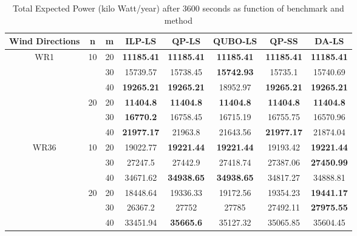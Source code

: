 \documentclass[preprint,12pt]{elsarticle}
\begin{document}
\begin{table}[ht]

	\begin{tabular}{| c | c | c | c | c | c | c | c |}
		\toprule
		Wind Directions  & n        & m        & ILP-LS       & QP-LS       & QUBO-LS       & QP-SS       & DA-LS     \\
		\toprule
		\multirow{6}{*}{WR1}  & \multirow{3}{*}{10}       & 20       & \textbf{11185.41} & \textbf{11185.41} & \textbf{11185.41} & \textbf{11185.41} & \textbf{11185.41} \\
			& & 30   & 15739.57 & 15738.45 & \textbf{15742.93} & 15735.1  & 15740.69         \\
		& & 40 & \textbf{19265.21} & \textbf{19265.21} & 18952.97 & \textbf{19265.21} & \textbf{19265.21}                \\
				\cline{2-8}
		&\multirow{3}{*}{20}   & 20       & \textbf{11404.8}  & \textbf{11404.8}  & \textbf{11404.8}  & \textbf{11404.8}  & \textbf{11404.8}           \\
		&&30   & \textbf{16770.2} & 16758.45 & 16715.19 & 16755.75 & 16570.96                   \\
		&&40   & \textbf{21977.17} & 21963.8 & 21643.56 & \textbf{21977.17} & 21874.04                     \\
		\hline
		\multirow{6}{*}{WR36} &  \multirow{3}{*}{10}    & 20       & 19022.77 & \textbf{19221.44} & \textbf{19221.44} & 19193.42 & \textbf{19221.44} \\
		&& 30   & 27247.5  & 27442.9  & 27418.74 & 27387.06 & \textbf{27450.99}                  \\
		&&40   & 34671.62 & \textbf{34938.65} & \textbf{34938.65} & 34817.27 & 34888.81                  \\
		\cline{2-8}
		&  \multirow{3}{*}{20}   & 20       & 18448.64 & 19336.33 & 19172.56 & 19354.23 & \textbf{19441.17}          \\
		&&30   & 26367.2  & 27752 & 27785 & 27492.11 & \textbf{27975.55}                     \\
		&&40   & 33451.94 & \textbf{35665.6}  & 35127.32 & 35065.85 & 35604.45  \\
		\bottomrule                   
	\end{tabular}

\vspace{0.5em}
\caption{Total Expected Power (kilo Watt/year) after 3600 seconds as function of benchmark and method}\label{tab:results1}
\end{table}
\end{document}
